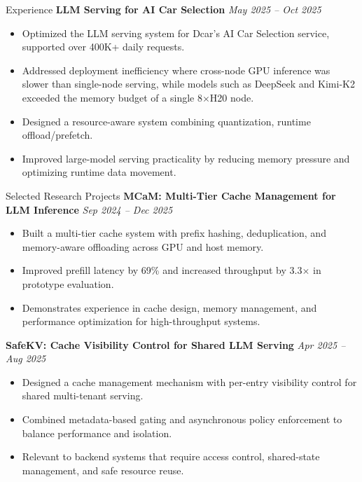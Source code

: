\documentclass[]{resume}
\newcommand{\sectionvspace}{\vspace{1.5pt}}
\begin{document}
\begin{rSection}{Experience}
\textbf{LLM Serving for AI Car Selection} \hfill \textit{May 2025 -- Oct 2025}
\begin{itemize}[leftmargin=1.2em, itemsep=0.2em, topsep=0.2em]
    \item Optimized the LLM serving system for Dcar's AI Car Selection service, supported over 400K+ daily requests.
    \item Addressed deployment inefficiency where cross-node GPU inference was slower than single-node serving, while models such as DeepSeek and Kimi-K2 exceeded the memory budget of a single 8$\times$H20 node.
    \item Designed a resource-aware system combining quantization, runtime offload/prefetch.
    \item Improved large-model serving practicality by reducing memory pressure and optimizing runtime data movement.
\end{itemize}

\end{rSection}
\newpage

\begin{rSection}{Selected Research Projects}\sectionvspace
\textbf{MCaM: Multi-Tier Cache Management for LLM Inference} \hfill \textit{Sep 2024 -- Dec 2025}
\begin{itemize}[leftmargin=1.2em, itemsep=0.2em, topsep=0.2em]
    \item Built a multi-tier cache system with prefix hashing, deduplication, and memory-aware offloading across GPU and host memory.
    \item Improved prefill latency by 69\% and increased throughput by 3.3$\times$ in prototype evaluation.
    \item Demonstrates experience in cache design, memory management, and performance optimization for high-throughput systems.
\end{itemize}

\textbf{SafeKV: Cache Visibility Control for Shared LLM Serving} \hfill \textit{Apr 2025 -- Aug 2025}
\begin{itemize}[leftmargin=1.2em, itemsep=0.2em, topsep=0.2em]
    \item Designed a cache management mechanism with per-entry visibility control for shared multi-tenant serving.
    \item Combined metadata-based gating and asynchronous policy enforcement to balance performance and isolation.
    \item Relevant to backend systems that require access control, shared-state management, and safe resource reuse.
\end{itemize}
\end{rSection}
\end{document}
